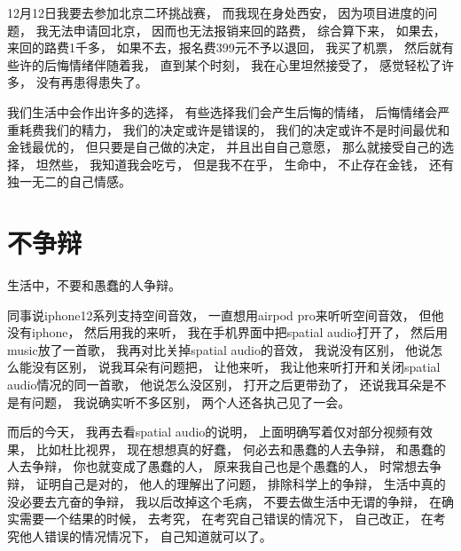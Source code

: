 12月12日我要去参加北京二环挑战赛，
而我现在身处西安，
因为项目进度的问题，
我无法申请回北京，
因而也无法报销来回的路费，
综合算下来，
如果去，来回的路费1千多，
如果不去，报名费399元不予以退回，
我买了机票，
然后就有些许的后悔情绪伴随着我，
直到某个时刻，
我在心里坦然接受了，
感觉轻松了许多，
没有再患得患失了。



我们生活中会作出许多的选择，
有些选择我们会产生后悔的情绪，
后悔情绪会严重耗费我们的精力，
我们的决定或许是错误的，
我们的决定或许不是时间最优和金钱最优的，
但只要是自己做的决定，
并且出自自己意愿，
那么就接受自己的选择，
坦然些，
我知道我会吃亏，
但是我不在乎，
生命中，
不止存在金钱，
还有独一无二的自己情感。







\section{不争辩}


生活中，不要和愚蠢的人争辩。


同事说iphone12系列支持空间音效，
一直想用airpod pro来听听空间音效，
但他没有iphone，
然后用我的来听，
我在手机界面中把spatial audio打开了，
然后用music放了一首歌，
我再对比关掉spatial audio的音效，
我说没有区别，
他说怎么能没有区别，
说我耳朵有问题把，
让他来听，
我让他来听打开和关闭spatial audio情况的同一首歌，
他说怎么没区别，
打开之后更带劲了，
还说我耳朵是不是有问题，
我说确实听不多区别，
两个人还各执己见了一会。

而后的今天，
我再去看spatial audio的说明，
上面明确写着仅对部分视频有效果，
比如杜比视界，
现在想想真的好蠢，
何必去和愚蠢的人去争辩，
和愚蠢的人去争辩，
你也就变成了愚蠢的人，
原来我自己也是个愚蠢的人，
时常想去争辩，
证明自己是对的，
他人的理解出了问题，
排除科学上的争辩，
生活中真的没必要去亢奋的争辩，
我以后改掉这个毛病，
不要去做生活中无谓的争辩，
在确实需要一个结果的时候，
去考究，
在考究自己错误的情况下，
自己改正，
在考究他人错误的情况情况下，
自己知道就可以了。
